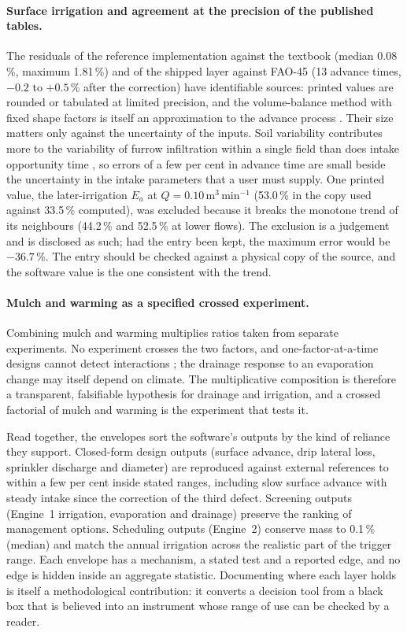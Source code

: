 \documentclass[preprint,12pt]{elsarticle}
\begin{document}
\paragraph{Surface irrigation and agreement at the precision of the published tables.} The residuals of the reference implementation against the textbook (median 0.08\,\%, maximum 1.81\,\%) and of the shipped layer against FAO-45 (13 advance times, $-0.2$ to $+0.5$\,\% after the correction) have identifiable sources: printed values are rounded or tabulated at limited precision, and the volume-balance method with fixed shape factors is itself an approximation to the advance process \cite{Walker1987,Elliott1982}. Their size matters only against the uncertainty of the inputs. Soil variability contributes more to the variability of furrow infiltration within a single field than does intake opportunity time \cite{Childs1993}, so errors of a few per cent in advance time are small beside the uncertainty in the intake parameters that a user must supply. One printed value, the later-irrigation $E_a$ at $Q=0.10$\,m$^3$\,min$^{-1}$ (53.0\,\% in the copy used against 33.5\,\% computed), was excluded because it breaks the monotone trend of its neighbours (44.2\,\% and 52.5\,\% at lower flows). The exclusion is a judgement and is disclosed as such; had the entry been kept, the maximum error would be $-36.7$\,\%. The entry should be checked against a physical copy of the source, and the software value is the one consistent with the trend.

\paragraph{Mulch and warming as a specified crossed experiment.} Combining mulch and warming multiplies ratios taken from separate experiments. No experiment crosses the two factors, and one-factor-at-a-time designs cannot detect interactions \cite{Saltelli2008}; the drainage response to an evaporation change may itself depend on climate. The multiplicative composition is therefore a transparent, falsifiable hypothesis for drainage and irrigation, and a crossed factorial of mulch and warming is the experiment that tests it.

Read together, the envelopes sort the software's outputs by the kind of reliance they support. Closed-form design outputs (surface advance, drip lateral loss, sprinkler discharge and diameter) are reproduced against external references to within a few per cent inside stated ranges, including slow surface advance with steady intake since the correction of the third defect. Screening outputs (Engine~1 irrigation, evaporation and drainage) preserve the ranking of management options. Scheduling outputs (Engine~2) conserve mass to 0.1\,\% (median) and match the annual irrigation across the realistic part of the trigger range. Each envelope has a mechanism, a stated test and a reported edge, and no edge is hidden inside an aggregate statistic. Documenting where each layer holds is itself a methodological contribution: it converts a decision tool from a black box that is believed into an instrument whose range of use can be checked by a reader.
\end{document}
